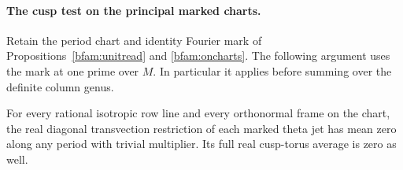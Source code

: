\paragraph{The cusp test on the principal marked charts.}
Retain the period chart and identity Fourier mark of
Propositions~\ref{bfam:unitread} and \ref{bfam:oncharts}.
The following argument uses the mark at one prime over \(M\).
In particular it applies before summing over the definite column genus.

\begin{lemma}\label{crev:mode}
For every rational isotropic row line and every orthonormal frame on
the chart, the real diagonal transvection restriction of each marked
theta jet has mean zero along any period with trivial multiplier.
Its full real cusp-torus average is zero as well.
\end{lemma}

